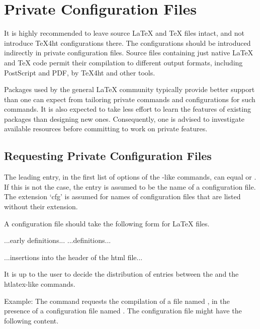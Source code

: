 \section{Private Configuration Files}\label{sec:private-configuration}

It is highly recommended to leave source LaTeX and TeX files intact, and not
introduce TeX4ht configurations there. The configurations should be introduced
indirectly in private configuration files. Source files containing just native
LaTeX and TeX code permit their compilation to different output formats,
including PostScript and PDF, by TeX4ht and other tools.

Packages used by the general LaTeX community typically provide better support
than one can expect from tailoring private commands and configurations for such
commands. It is also expected to take less effort to learn the features of
existing packages than designing new ones. Consequently, one is advised to
investigate available resources before committing to work on private features. 

\subsection{Requesting Private Configuration Files}

The leading entry, in the first list of options of the -like
commands, can equal  or . If this is not the case,
the entry is assumed to be the name of a configuration file. The extension
‘cfg’ is assumed for names of configuration files that are listed without their
extension.

A configuration file should take the following form for LaTeX files.

\begin{texsource}
...early definitions...
...definitions...

...insertions into the header of the html file...
\EndPreamble
\end{texsource}

It is up to the user to decide the distribution of entries between the
\texcommand{\Preamble} and the htlatex-like commands.

Example: The command  requests the
compilation of a file named , in the presence of a
configuration file named . The configuration file might have the
following content.

\begin{texsource}
 
\EndPreamble 
\end{texsource}

